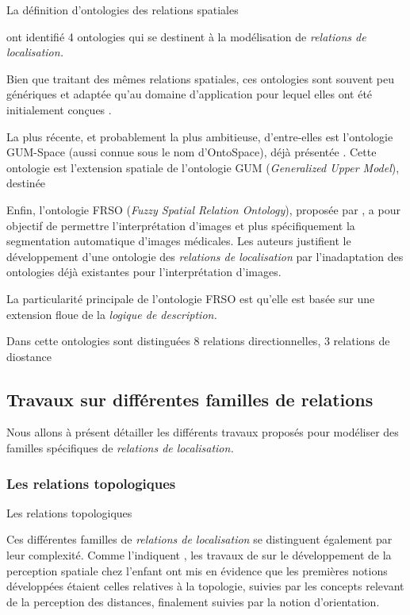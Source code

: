 La définition d'ontologies des relations spatiales

\textcite{Duchene2019} ont identifié 4 ontologies qui se destinent à
la modélisation de \emph{relations de localisation.}

Bien que traitant des mêmes relations spatiales, ces ontologies sont
souvent peu génériques et adaptée qu'au domaine d’application pour
lequel elles ont été initialement conçues \autocite{Hudelot2008a}.

La plus récente, et probablement la plus ambitieuse, d'entre-elles est
l'ontologie GUM-Space (aussi connue sous le nom d'OntoSpace), déjà
présentée \autocite{Bateman2010}.
%
Cette ontologie est l'extension spatiale de l'ontologie GUM
(\emph{Generalized Upper Model}), destinée




Enfin, l'ontologie FRSO (\emph{Fuzzy Spatial Relation Ontology}),
proposée par \textcite{Hudelot2008a}, a pour objectif de permettre
l’interprétation d'images et plus spécifiquement la segmentation
automatique d'images médicales. Les auteurs justifient le
développement d'une ontologie des \emph{relations de localisation} par
l'inadaptation des ontologies déjà existantes pour l'interprétation
d'images.

La particularité principale de l'ontologie FRSO est qu'elle est basée
sur une extension floue de la \emph{logique de description.}

Dans cette ontologies sont distinguées 8 relations directionnelles, 3
relations de diostance




\subsection{Travaux sur différentes familles de relations}

Nous allons à présent détailler les différents travaux proposés pour
modéliser des familles spécifiques de \emph{relations de
  localisation.}

\subsubsection{Les relations topologiques}

Les relations topologiques 

Ces différentes familles de \emph{relations de localisation} se
distinguent également par leur complexité. Comme l'indiquent
\textcite{Aurnague1997}, les travaux de \textcite{Piaget1948} sur le
développement de la perception spatiale chez l'enfant ont mis en
évidence que les premières notions développées étaient celles
relatives à la topologie, suivies par les concepts relevant de la
perception des distances, finalement suivies par la notion
d'orientation.

